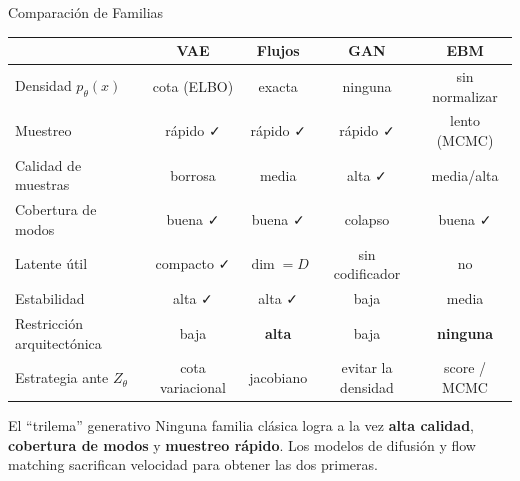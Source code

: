 \documentclass[aspectratio=169, 10pt]{beamer}
\newcommand{\good}{{\color{AccentGreen}\faCheck}}
\newcommand{\bad}{{\color{AdaptRed}\faTimes}}
\newcommand{\meh}{{\color{orange}\faMinus}}
\begin{document}
\begin{frame}[shrink]{Comparaci\'on de Familias}

	\begin{center}
		\renewcommand{\arraystretch}{1.4}
		\footnotesize\setlength{\tabcolsep}{4pt}
		\begin{tabular}{lcccc}
			\toprule
			& \textbf{VAE} & \textbf{Flujos} & \textbf{GAN} & \textbf{EBM} \\
			\midrule
			Densidad $p_\theta(x)$ & cota (ELBO) & exacta & ninguna & sin normalizar \\
			Muestreo & r\'apido \good & r\'apido \good & r\'apido \good & lento (MCMC) \bad \\
			Calidad de muestras & borrosa \meh & media \meh & alta \good & media/alta \meh \\
			Cobertura de modos & buena \good & buena \good & colapso \bad & buena \good \\
			Latente \'util & compacto \good & $\dim = D$ \meh & sin codificador \meh & no \bad \\
			Estabilidad & alta \good & alta \good & baja \bad & media \meh \\
			Restricci\'on arquitect\'onica & baja & \textbf{alta} & baja & \textbf{ninguna} \\
			\midrule
			Estrategia ante $Z_\theta$ & cota variacional & jacobiano & evitar la densidad & score / MCMC \\
			\bottomrule
		\end{tabular}
	\end{center}

	\vspace{0.2cm}

	\begin{alertblock}{El ``trilema'' generativo}
		Ninguna familia cl\'asica logra a la vez \textbf{alta calidad}, \textbf{cobertura de modos} y \textbf{muestreo r\'apido}. Los modelos de difusi\'on y flow matching sacrifican velocidad para obtener las dos primeras.
	\end{alertblock}

\end{frame}
\end{document}
